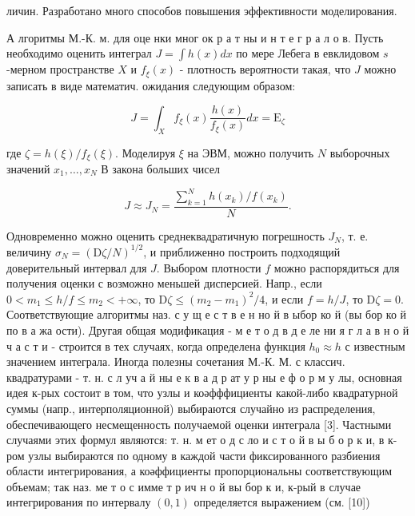 \documentclass[10pt]{article}
\begin{document}
личин. Разработано много способов повышения эффективности моделирования.



А лгоритмы М.-К. м. для оце нки мног ок р а т ны и н т е г р а л о в. Пусть необходимо оценить интеграл $J=\int h(x) d x$ по мере Лебега в евклидовом $s$-мерном пространстве $X$ и $f_{\xi}(x)$ - плотность вероятности такая, что $J$ можно записать в виде математич. ожидания следующим образом:



\[

J=\int_{X} f_{\xi}(x) \frac{h(x)}{f_{\xi}(x)} d x=\mathrm{E}_{\zeta}

\]



где $\zeta=h(\xi) / f_{\xi}(\xi)$. Моделируя $\xi$ на ЭВМ, можно получить $N$ выборочных значений $x_{1}, \ldots, x_{N}$ В закона больших чисел



\[

J \approx J_{N}=\frac{\sum_{k=1}^{N} h\left(x_{k}\right) / f\left(x_{k}\right)}{N} .

\]



Одновременно можно оценить среднеквадратичную погрешность $J_{N}$, т. е. величину $\sigma_{N}=(\mathrm{D} \zeta / N)^{1 / 2}$, и приближенно построить подходящий доверительный интервал для $J$. Выбором плотности $f$ можно распорядиться для получения оценки с возможно меньшей дисперсией. Напр., если $0<m_{1} \leqslant h / f \leqslant m_{2}<+\infty$, то $\mathrm{D} \zeta \leqslant\left(m_{2}-m_{1}\right)^{2} / 4$, и если $f=h / J$, то $\mathrm{D} \zeta=0$. Соответствующие алгоритмы наз. с у щ е с т в е н но й в ыбор ко й (вы бор ко й по в а жа ости). Другая общая модификация - м е т о д в д е ле ни я г л а в н о й ч а с т и - строится в тех случаях, когда определена функция $h_{0} \approx h$ с известным значением интеграла. Иногда полезны сочетания М.-К. М. с классич. квадратурами - т. н. с л уч а й ны е к в а д р ат у р ны е ф о р м у лы, основная идея к-рых состоит в том, что узлы и коәфффициенты какой-либо квадратурной суммы (напр., интерполяционной) выбираются случайно из распределения, обеспечивающего несмещенность получаемой оценки интеграла [3]. Частными случаями этих формул являются: т. н. м ет о д с ло и с т о й в ы б о р к и, в к-ром узлы выбираются по одному в каждой части фиксированного разбиения области интегрирования, а коәффициенты пропорциональны соответствующим объемам; так наз. ме т о с имме т р ич н о й вы бор к и, к-рый в случае интегрирования по интервалу $(0,1)$ определяется выражением (см. [10])
\end{document}
